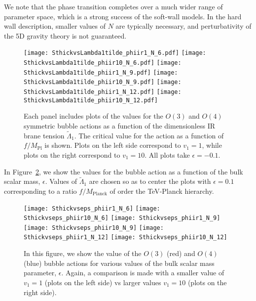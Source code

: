 \documentclass[12pt]{article}
\renewcommand{\tilde}{\widetilde} %
\begin{document}
We note that the phase transition completes over a much wider range of parameter space, which is a strong success of the soft-wall models.  In the hard wall description, smaller values of $N$ are typically necessary, and perturbativity of the 5D gravity theory is not guaranteed.  

\begin{figure}[!htbp]
	\center
	\texttt{[image: SthickvsLambda1tilde\_phiir1\_N\_6.pdf]}
	\texttt{[image: SthickvsLambda1tilde\_phiir10\_N\_6.pdf]}
	\texttt{[image: SthickvsLambda1tilde\_phiir1\_N\_9.pdf]}
	\texttt{[image: SthickvsLambda1tilde\_phiir10\_N\_9.pdf]}
	\texttt{[image: SthickvsLambda1tilde\_phiir1\_N\_12.pdf]}
	\texttt{[image: SthickvsLambda1tilde\_phiir10\_N\_12.pdf]}
	\caption{Each panel includes plots of the values for the $O(3)$ and $O(4)$ symmetric bubble actions as a function of the dimensionless IR brane tension $\tilde{\Lambda}_1$.  The critical value for the action as a function of $f/M_\text{Pl}$ is shown.  Plots on the left side correspond to $v_1=1$, while plots on the right correspond to $v_1=10$.  All plots take $\epsilon = -0.1$.
	}
	\label{fig:action}
\end{figure}

In Figure~\ref{fig:epsilonaction}, we show the values for the bubble action as a function of the bulk scalar mass, $\epsilon$.  Values of $\tilde{\Lambda}_1$ are chosen so as to center the plots with $\epsilon = 0.1$ corresponding to a  ratio $f/M_\text{Planck}$ of order the TeV-Planck hierarchy.  

\begin{figure}[!htbp]
	\center
	\texttt{[image: Sthickvseps\_phiir1\_N\_6]}
	\texttt{[image: Sthickvseps\_phiir10\_N\_6]}
	\texttt{[image: Sthickvseps\_phiir1\_N\_9]}
	\texttt{[image: Sthickvseps\_phiir10\_N\_9]}
	\texttt{[image: Sthickvseps\_phiir1\_N\_12]}
	\texttt{[image: Sthickvseps\_phiir10\_N\_12]}
	\caption{In this figure, we show the value of the $O(3)$ (red) and $O(4)$ (blue) bubble actions for various values of the bulk scalar mass parameter, $\epsilon$.  Again, a comparison is made with a smaller value of $v_1=1$ (plots on the left side) vs larger values $v_1=10$ (plots on the right side).}
\label{fig:epsilonaction}
\end{figure}
\end{document}
